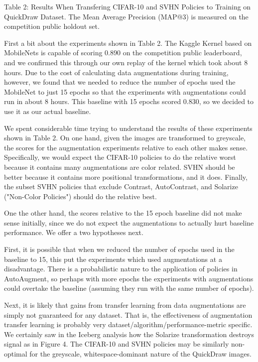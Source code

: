 \documentclass[10pt,twocolumn,letterpaper]{article}
\begin{document}
Table 2: Results When Transfering CIFAR-10 and SVHN Policies to Training on QuickDraw Dataset.  The Mean Average Precision (MAP@3) is measured on the competition public holdout set.

First a bit about the experiments shown in Table 2.  The Kaggle Kernel based on MobileNets is capable of scoring 0.890 on the competition public leaderboard, and we confirmed this through our own replay of the kernel which took about 8 hours.  Due to the cost of calculating data augmentations during training, however, we found that we needed to reduce the number of epochs used the MobileNet to just 15 epochs so that the experiments with augmentations could run in about 8 hours.  This baseline with 15 epochs scored 0.830, so we decided to use it as our actual baseline.

We spent considerable time trying to understand the results of these experiments shown in Table 2.  On one hand, given the images are transformed to greyscale, the scores for the augmentation experiments relative to each other makes sense.  Specifically, we would expect the CIFAR-10 policies to do the relative worst because it contains many augmentations are color related.  SVHN should be better because it contains more positional transformations, and it does.  Finally, the subset SVHN policies that exclude Contrast, AutoContrast, and Solarize ("Non-Color Policies") should do the relative best.

One the other hand, the scores relative to the 15 epoch baseline did not make sense initially, since we do not expect the augmentations to actually hurt baseline performance.  We offer a two hypotheses next.  

First, it is possible that when we reduced the number of epochs used in the baseline to 15, this put the experiments which used augmentations at a disadvantage. There is a probabilistic nature to the application of policies in AutoAugment, so perhaps with more epochs the experiments with augmentations could overtake the baseline (assuming they run with the same number of epochs).

Next, it is likely that gains from transfer learning from data augmentations are simply not guaranteed for any dataset.  That is, the effectiveness of augmentation transfer learning is probably very dataset/algorithm/performance-metric specific.  We certainly saw in the Iceberg analysis how the Solarize transformation destroys signal as in Figure 4.  The CIFAR-10 and SVHN policies may be similarly non-optimal for the greyscale, whitespace-dominant nature of the QuickDraw images.
\end{document}
